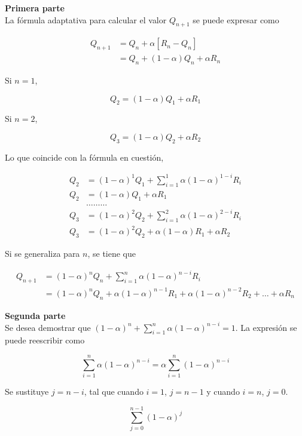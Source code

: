 \documentclass[12pt]{article}
\begin{document}
    \textbf{Primera parte}\\
    La fórmula adaptativa para calcular el valor $Q_{n+1}$ se puede expresar como

    \begin{align*}
        Q_{n+1} &= Q_n+\alpha\left[R_{n}-Q_{n}\right] \\
        &= Q_n + \left(1-\alpha\right)Q_n + \alpha R_n
    \end{align*}

    Si $n=1$,

    \[
        Q_{2} = \left(1-\alpha\right)Q_1 + \alpha R_1
    \]

    Si $n=2$,

    \[
        Q_{3} = \left(1-\alpha\right)Q_2 + \alpha R_2
    \]

    Lo que coincide con la fórmula en cuestión,

    \begin{align*}
        Q_{2} &= (1-\alpha)^{1}Q_{1} + \sum_{i=1}^{1} \alpha(1-\alpha)^{1-i}R_{i} \\
        Q_{2}&= (1-\alpha)Q_{1} + \alpha R_{1} \\
        & \ldots \ldots \ldots \\
        Q_{3} &= (1-\alpha)^{2}Q_{2} + \sum_{i=1}^{2} \alpha(1-\alpha)^{2-i}R_{i} \\
        Q_{3}& = (1-\alpha)^{2}Q_{2} + \alpha(1-\alpha)R_{1} + \alpha R_{2}
    \end{align*}

    Si se generaliza para $n$, se tiene que

    \begin{align*}
        Q_{n+1} &= (1-\alpha)^{n}Q_{n} + \sum_{i=1}^{n} \alpha(1-\alpha)^{n-i}R_{i} \\
        &= (1-\alpha)^{n}Q_{n} + \alpha(1-\alpha)^{n-1}R_{1} + \alpha(1-\alpha)^{n-2}R_{2} + \ldots + \alpha R_{n}
    \end{align*}

    \textbf{Segunda parte}\\
    Se desea demostrar que $(1-\alpha)^{n}+\sum_{i=1}^{n} \alpha(1-\alpha)^{n-i}=1$.
    La expresión se puede reescribir como

    \[
        \sum_{i=1}^{n} \alpha\left( 1 - \alpha \right)^{n-i} = \alpha\sum_{i=1}^{n} \left( 1 - \alpha \right)^{n-i}
    \]

    Se sustituye $j=n-i$, tal que cuando $i=1$, $j=n-1$ y cuando $i=n$, $j=0$.

    \[
        \sum_{j=0}^{n-1} \left( 1-\alpha \right)^{j}
    \]
\end{document}
